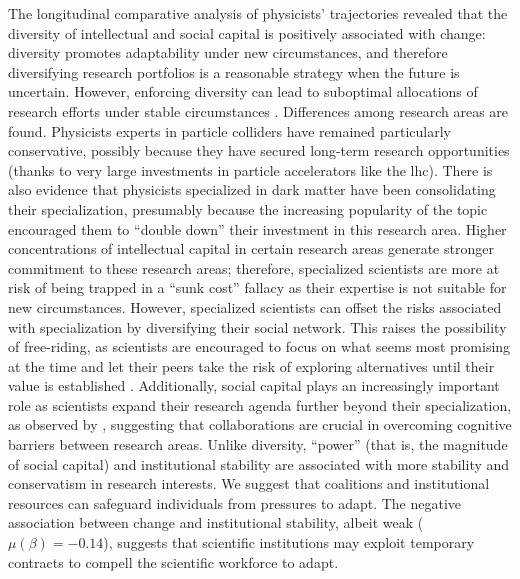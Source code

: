 \documentclass{article}
\begin{document}
The longitudinal comparative analysis of physicists' trajectories revealed that the diversity of intellectual and social capital is positively associated with change: diversity promotes adaptability under new circumstances, and therefore diversifying research portfolios is a reasonable strategy when the future is uncertain. However, enforcing diversity can lead to suboptimal allocations of research efforts under stable circumstances \citep{Schimmelpfennig2021}. Differences among research areas are found. Physicists experts in particle colliders have remained particularly conservative, possibly because they have secured long-term research opportunities (thanks to very large investments in particle accelerators like the \gls{lhc}). There is also evidence that physicists specialized in dark matter have been consolidating their specialization, presumably because the increasing popularity of the topic encouraged them to ``double down'' their investment in this research area. Higher concentrations of intellectual capital in certain research areas generate stronger commitment to these research areas; therefore, specialized scientists are more at risk of being trapped in a ``sunk cost'' fallacy as their expertise is not suitable for new circumstances. However, specialized scientists can offset the risks associated with specialization by diversifying their social network. This raises the possibility of free-riding, as scientists are encouraged to focus on what seems most promising at the time and let their peers take the risk of exploring alternatives until their value is established \citep{Kummerfeld2016}. Additionally, social capital plays an increasingly important role as scientists expand their research agenda further beyond their specialization, as observed by \citealt{Tripodi2020}, suggesting that collaborations are crucial in overcoming cognitive barriers between research areas. Unlike diversity, ``power'' (that is, the magnitude of social capital) and institutional stability are associated with more stability and conservatism in research interests. We suggest that coalitions and institutional resources can safeguard individuals from pressures to adapt. The negative association between change and institutional stability, albeit weak ($\mu(\beta)=-0.14$), suggests that scientific institutions may exploit temporary contracts to compell the scientific workforce to adapt.

\end{document}
